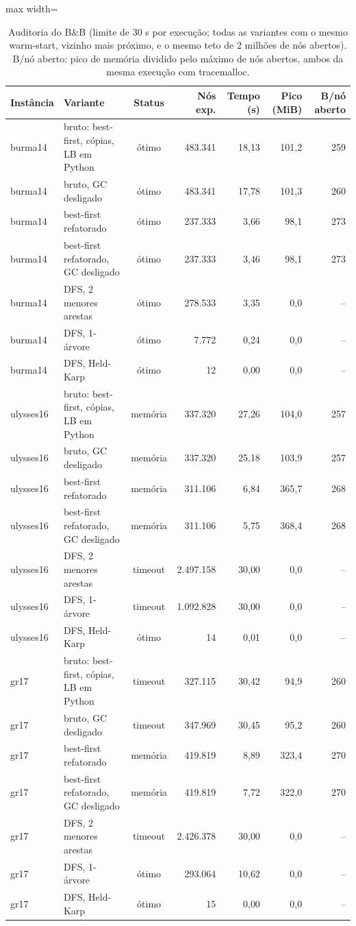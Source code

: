 \begin{table}[htb]
\centering
\caption{Auditoria do B\&B (limite de 30 s por execução; todas as variantes com o mesmo warm-start, vizinho mais próximo, e o mesmo teto de 2 milhões de nós abertos). B/nó aberto: pico de memória dividido pelo máximo de nós abertos, ambos da mesma execução com tracemalloc.}
\label{tab:auditoria_bnb}
\small
\begin{adjustbox}{max width=\linewidth}
\begin{tabular}{llcrrrr}
\toprule
Instância & Variante & Status & Nós exp. & Tempo (s) & Pico (MiB) & B/nó aberto \\
\midrule
burma14 & bruto: best-first, cópias, LB em Python & ótimo & 483.341 & 18{,}13 & 101{,}2 & 259 \\
burma14 & bruto, GC desligado & ótimo & 483.341 & 17{,}78 & 101{,}3 & 260 \\
burma14 & best-first refatorado & ótimo & 237.333 & 3{,}66 & 98{,}1 & 273 \\
burma14 & best-first refatorado, GC desligado & ótimo & 237.333 & 3{,}46 & 98{,}1 & 273 \\
burma14 & DFS, 2 menores arestas & ótimo & 278.533 & 3{,}35 & 0{,}0 & -- \\
burma14 & DFS, 1-árvore & ótimo & 7.772 & 0{,}24 & 0{,}0 & -- \\
burma14 & DFS, Held-Karp & ótimo & 12 & 0{,}00 & 0{,}0 & -- \\
ulysses16 & bruto: best-first, cópias, LB em Python & memória & 337.320 & 27{,}26 & 104{,}0 & 257 \\
ulysses16 & bruto, GC desligado & memória & 337.320 & 25{,}18 & 103{,}9 & 257 \\
ulysses16 & best-first refatorado & memória & 311.106 & 6{,}84 & 365{,}7 & 268 \\
ulysses16 & best-first refatorado, GC desligado & memória & 311.106 & 5{,}75 & 368{,}4 & 268 \\
ulysses16 & DFS, 2 menores arestas & timeout & 2.497.158 & 30{,}00 & 0{,}0 & -- \\
ulysses16 & DFS, 1-árvore & timeout & 1.092.828 & 30{,}00 & 0{,}0 & -- \\
ulysses16 & DFS, Held-Karp & ótimo & 14 & 0{,}01 & 0{,}0 & -- \\
gr17 & bruto: best-first, cópias, LB em Python & timeout & 327.115 & 30{,}42 & 94{,}9 & 260 \\
gr17 & bruto, GC desligado & timeout & 347.969 & 30{,}45 & 95{,}2 & 260 \\
gr17 & best-first refatorado & memória & 419.819 & 8{,}89 & 323{,}4 & 270 \\
gr17 & best-first refatorado, GC desligado & memória & 419.819 & 7{,}72 & 322{,}0 & 270 \\
gr17 & DFS, 2 menores arestas & timeout & 2.426.378 & 30{,}00 & 0{,}0 & -- \\
gr17 & DFS, 1-árvore & ótimo & 293.064 & 10{,}62 & 0{,}0 & -- \\
gr17 & DFS, Held-Karp & ótimo & 15 & 0{,}00 & 0{,}0 & -- \\
\bottomrule
\end{tabular}
\end{adjustbox}
\end{table}

